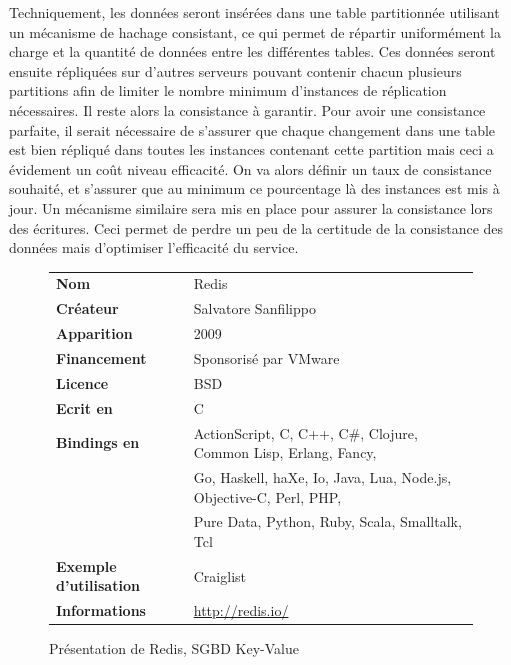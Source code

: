 \documentclass[11pt]{article}
\begin{document}
Techniquement, les données seront insérées dans une table partitionnée utilisant un mécanisme de hachage consistant, ce qui permet de répartir uniformément la charge et la quantité de données entre les différentes tables. Ces données seront ensuite répliquées sur d'autres serveurs pouvant contenir chacun plusieurs partitions afin de limiter le nombre minimum d'instances de réplication nécessaires. Il reste alors la consistance à garantir. Pour avoir une consistance parfaite, il serait nécessaire de s'assurer que chaque changement dans une table est bien répliqué dans toutes les instances contenant cette partition mais ceci a évidement un coût niveau efficacité. On va alors définir un taux de consistance souhaité, et s'assurer que au minimum ce pourcentage là des instances est mis à jour. Un mécanisme similaire sera mis en place pour assurer la consistance lors des écritures. Ceci permet de perdre un peu de la certitude de la consistance des données mais d'optimiser l'efficacité du service.
\begin{figure}[H]
  \centering
  \begin{tabular}{l | l}
    \textbf{Nom} & Redis \\
    \textbf{Créateur} & Salvatore Sanfilippo \\
    \textbf{Apparition} & 2009 \\
    \textbf{Financement} & Sponsorisé par VMware \\
    \textbf{Licence} & BSD \\
    \textbf{Ecrit en} & C \\
    \textbf{Bindings en} & ActionScript, C, C++, C\#, Clojure, Common Lisp, Erlang, Fancy, \\
    &  Go, Haskell, haXe, Io, Java, Lua, Node.js, Objective-C, Perl, PHP, \\
    & Pure Data, Python, Ruby, Scala, Smalltalk, Tcl\\
    \textbf{Exemple d'utilisation} & Craiglist \\
    \textbf{Informations} & \url{http://redis.io/}
  \end{tabular}
  \caption{Présentation de Redis, SGBD Key-Value}
\end{figure}
\end{document}
